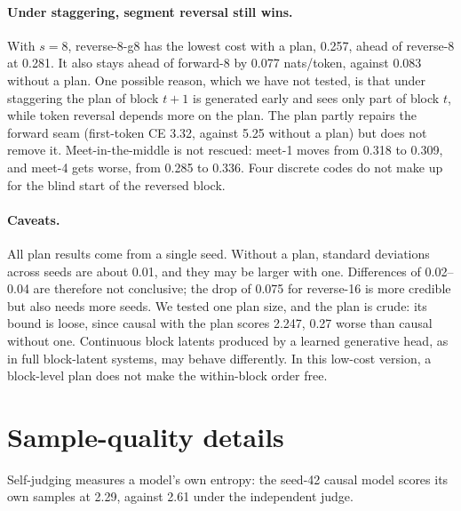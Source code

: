 \documentclass[11pt]{article}
\theoremstyle{definition}
\theoremstyle{remark}
\newcommand{\sch}[1]{\textsf{#1}}
\begin{document}
\paragraph{Under staggering, segment reversal still wins.}
With $s=8$, \sch{reverse-8-g8} has the lowest cost with a plan, 0.257, ahead of \sch{reverse-8} at 0.281.
It also stays ahead of \sch{forward-8} by 0.077 nats/token, against 0.083 without a plan.
One possible reason, which we have not tested, is that under staggering the plan of block $t+1$ is generated early and sees only part of block $t$, while token reversal depends more on the plan.
The plan partly repairs the forward seam (first-token CE 3.32, against 5.25 without a plan) but does not remove it.
Meet-in-the-middle is not rescued: \sch{meet-1} moves from 0.318 to 0.309, and \sch{meet-4} gets worse, from 0.285 to 0.336.
Four discrete codes do not make up for the blind start of the reversed block.

\paragraph{Caveats.}
All plan results come from a single seed.
Without a plan, standard deviations across seeds are about 0.01, and they may be larger with one.
Differences of 0.02--0.04 are therefore not conclusive; the drop of 0.075 for \sch{reverse-16} is more credible but also needs more seeds.
We tested one plan size, and the plan is crude: its bound is loose, since \sch{causal} with the plan scores 2.247, 0.27 worse than \sch{causal} without one.
Continuous block latents produced by a learned generative head, as in full block-latent systems, may behave differently.
In this low-cost version, a block-level plan does not make the within-block order free.

\section{Sample-quality details}
\label{app:samples}

Self-judging measures a model's own entropy: the seed-42 causal model scores its own samples at 2.29, against 2.61 under the independent judge.
\end{document}
